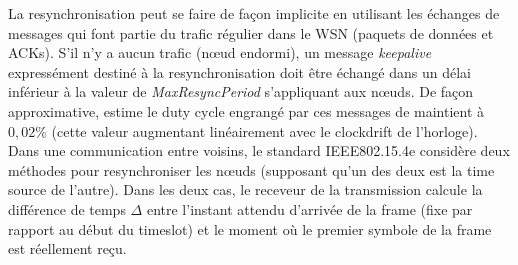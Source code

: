 \documentclass[]{report}
\begin{document}
\par La resynchronisation peut se faire de façon implicite en utilisant les échanges de messages qui font partie du trafic régulier dans le WSN (paquets de données et ACKs). S'il n'y a aucun trafic (nœud endormi), un message \textit{keepalive} expressément destiné à la resynchronisation doit être échangé dans un délai inférieur à la valeur de \textit{MaxResyncPeriod} s'appliquant aux nœuds. De façon approximative, \cite{openWSN} estime le duty cycle engrangé par ces messages de maintient à $0,02\%$ (cette valeur augmentant linéairement avec le clockdrift de l'horloge). Dans une communication entre voisins, le standard IEEE802.15.4e \cite{IEEE802.15.4} considère deux méthodes pour resynchroniser les nœuds (supposant qu'un des deux est la time source de l'autre). Dans les deux cas, le receveur de la transmission calcule la différence de temps $\Delta$ entre l'instant attendu d'arrivée de la frame (fixe par rapport au début du timeslot) et le moment où le premier symbole de la frame est réellement reçu.

\vspace{0.2cm}
\end{document}
